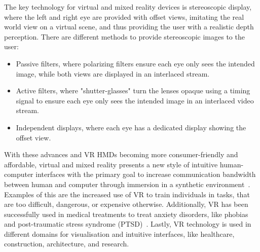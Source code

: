 The key technology for virtual and mixed reality devices is stereoscopic display, where the left and right eye are
provided with offset views, imitating the real world view on a virtual scene, and thus providing the user with a
realistic depth perception.
There are different methods to provide stereoscopic images to the user:
\begin{itemize}
    \item Passive filters, where polarizing filters ensure each eye only sees the intended image, while both views
    are displayed in an interlaced stream.
    \item Active filters, where "shutter-glasses" turn the lenses opaque using a timing signal to ensure each eye
    only sees the intended image in an interlaced video stream.
    \item Independent displays, where each eye has a dedicated display showing the offset view.
\end{itemize}

With these advances and VR HMDs becoming more consumer-friendly and affordable, virtual and mixed reality presents a
new style of intuitive human-computer interfaces with the primary goal to increase communication bandwidth between
human and computer through immersion in a synthetic environment~\cite{Davis2014}.
Examples of this are the increased use of VR to train individuals in tasks, that are too difficult, dangerous, or
expensive otherwise.
Additionally, VR has been successfully used in medical treatments to treat anxiety disorders, like phobias and
post-traumatic stress syndrome (PTSD)~\cite{Clifton2020}.
Lastly, VR technology is used in different domains for visualisation and intuitive interfaces, like healthcare,
construction, architecture, and research.
